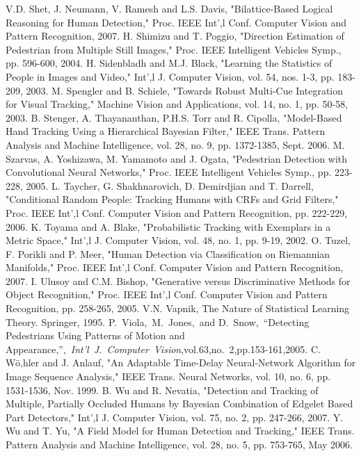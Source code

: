 \documentclass[10pt,letterpaper,journal,compsoc]{IEEEtran}
\begin{document}
\begin{thebibliography}{99}
V.D. Shet, J. Neumann, V. Ramesh and L.S. Davis, "Bilattice-Based Logical Reasoning for Human Detection," Proc. IEEE Int',l Conf. Computer Vision and Pattern Recognition, 2007. 
H. Shimizu and T. Poggio, "Direction Estimation of Pedestrian from Multiple Still Images," Proc. IEEE Intelligent Vehicles Symp., pp. 596-600, 2004. 
H. Sidenbladh and M.J. Black, "Learning the Statistics of People in Images and Video," Int',l J. Computer Vision, vol. 54, nos. 1-3, pp. 183-209, 2003. 
M. Spengler and B. Schiele, "Towards Robust Multi-Cue Integration for Visual Tracking," Machine Vision and Applications, vol. 14, no. 1, pp. 50-58, 2003. 
B. Stenger, A. Thayananthan, P.H.S. Torr and R. Cipolla, "Model-Based Hand Tracking Using a Hierarchical Bayesian Filter," IEEE Trans. Pattern Analysis and Machine Intelligence, vol. 28, no. 9, pp. 1372-1385, Sept. 2006. 
M. Szarvas, A. Yoshizawa, M. Yamamoto and J. Ogata, "Pedestrian Detection with Convolutional Neural Networks," Proc. IEEE Intelligent Vehicles Symp., pp. 223-228, 2005. 
L. Taycher, G. Shakhnarovich, D. Demirdjian and T. Darrell, "Conditional Random People: Tracking Humans with CRFs and Grid Filters," Proc. IEEE Int',l Conf. Computer Vision and Pattern Recognition, pp. 222-229, 2006. 
K. Toyama and A. Blake, "Probabilistic Tracking with Exemplars in a Metric Space," Int',l J. Computer Vision, vol. 48, no. 1, pp. 9-19, 2002. 
O. Tuzel, F. Porikli and P. Meer, "Human Detection via Classification on Riemannian Manifolds," Proc. IEEE Int',l Conf. Computer Vision and Pattern Recognition, 2007. 
I. Ulusoy and C.M. Bishop, "Generative versus Discriminative Methods for Object Recognition," Proc. IEEE Int',l Conf. Computer Vision and Pattern Recognition, pp. 258-265, 2005. 
V.N. Vapnik, The Nature of Statistical Learning Theory. Springer, 1995. 
P.~Viola,~M.~Jones,~and D.~Snow,~``Detecting Pedestrians Using Patterns of Motion and Appearance,'',~\emph{Int'l~J.~Computer~Vision},vol.63,no.~2,pp.153-161,2005.
C. Wö,hler and J. Anlauf, "An Adaptable Time-Delay Neural-Network Algorithm for Image Sequence Analysis," IEEE Trans. Neural Networks, vol. 10, no. 6, pp. 1531-1536, Nov. 1999. 
B. Wu and R. Nevatia, "Detection and Tracking of Multiple, Partially Occluded Humans by Bayesian Combination of Edgelet Based Part Detectors," Int',l J. Computer Vision, vol. 75, no. 2, pp. 247-266, 2007. 
Y. Wu and T. Yu, "A Field Model for Human Detection and Tracking," IEEE Trans. Pattern Analysis and Machine Intelligence, vol. 28, no. 5, pp. 753-765, May 2006. 

\end{thebibliography}
\end{document}
